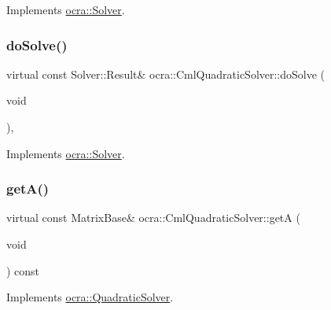 Implements \hyperlink{classocra_1_1Solver_a9ab90e87025e3da7239141c48d28ab4a}{ocra\+::\+Solver}.

\hypertarget{classocra_1_1CmlQuadraticSolver_aac5943e307225837253c470a931640ec}{}\label{classocra_1_1CmlQuadraticSolver_aac5943e307225837253c470a931640ec} 
\subsubsection{\texorpdfstring{do\+Solve()}{doSolve()}}
{\footnotesize\ttfamily virtual const Solver\+::\+Result\& ocra\+::\+Cml\+Quadratic\+Solver\+::do\+Solve (\begin{DoxyParamCaption}\item[{void}]{ }\end{DoxyParamCaption})\hspace{0.3cm}{\ttfamily [protected]}, {\ttfamily [virtual]}}



Implements \hyperlink{classocra_1_1Solver_ace2d7cfe741611de6dc87a0de7e7f3a9}{ocra\+::\+Solver}.

\hypertarget{classocra_1_1CmlQuadraticSolver_a6bbc784066ced7a347a32de698069d07}{}\label{classocra_1_1CmlQuadraticSolver_a6bbc784066ced7a347a32de698069d07} 
\subsubsection{\texorpdfstring{get\+A()}{getA()}}
{\footnotesize\ttfamily virtual const Matrix\+Base\& ocra\+::\+Cml\+Quadratic\+Solver\+::getA (\begin{DoxyParamCaption}\item[{void}]{ }\end{DoxyParamCaption}) const\hspace{0.3cm}{\ttfamily [virtual]}}



Implements \hyperlink{classocra_1_1QuadraticSolver_aa3904e85d74c7c88c3605a082741b8cd}{ocra\+::\+Quadratic\+Solver}.

\hypertarget{classocra_1_1CmlQuadraticSolver_a1af1421b10bd780438cef59ac0293749}{}\label{classocra_1_1CmlQuadraticSolver_a1af1421b10bd780438cef59ac0293749} 

